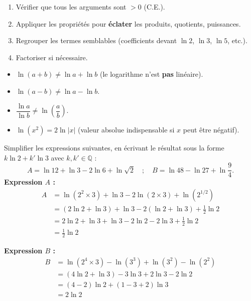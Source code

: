\documentclass[11pt]{article}
\begin{document}
\begin{methode}
\begin{enumerate}
\item Vérifier que tous les arguments sont $>0$ (C.E.).
\item Appliquer les propriétés pour \textbf{éclater} les produits, quotients, puissances.
\item Regrouper les termes semblables (coefficients devant $\ln 2$, $\ln 3$, $\ln 5$, etc.).
\item Factoriser si nécessaire.
\end{enumerate}
\end{methode}

\begin{attention}
\begin{itemize}
\item $\ln(a+b) \neq \ln a + \ln b$ (le logarithme n'est \textbf{pas} linéaire).
\item $\ln(a-b) \neq \ln a - \ln b$.
\item $\dfrac{\ln a}{\ln b} \neq \ln\!\left(\dfrac{a}{b}\right)$.
\item $\ln(x^2) = 2\ln|x|$ (valeur absolue indispensable si $x$ peut être négatif).
\end{itemize}
\end{attention}

\begin{exoresolu}
Simplifier les expressions suivantes, en écrivant le résultat sous la forme $k\ln 2 + k'\ln 3$ avec $k,k'\in\mathbb{Q}$ :
\[ A=\ln 12+\ln 3-2\ln 6+\ln\sqrt{2} \quad ; \quad B=\ln 48-\ln 27+\ln\dfrac{9}{4}. \]
\tcblower
\textbf{Expression $A$ :}
\begin{align*}
A &= \ln(2^2\times 3) + \ln 3 - 2\ln(2\times 3) + \ln(2^{1/2}) \\
  &= (2\ln 2 + \ln 3) + \ln 3 - 2(\ln 2 + \ln 3) + \tfrac{1}{2}\ln 2 \\
  &= 2\ln 2 + \ln 3 + \ln 3 - 2\ln 2 - 2\ln 3 + \tfrac{1}{2}\ln 2 \\
  &= \boxed{\tfrac{1}{2}\ln 2}
\end{align*}

\textbf{Expression $B$ :}
\begin{align*}
B &= \ln(2^4\times 3) - \ln(3^3) + \ln(3^2) - \ln(2^2) \\
  &= (4\ln 2 + \ln 3) - 3\ln 3 + 2\ln 3 - 2\ln 2 \\
  &= (4-2)\ln 2 + (1-3+2)\ln 3 \\
  &= \boxed{2\ln 2}
\end{align*}
\end{exoresolu}
\end{document}
